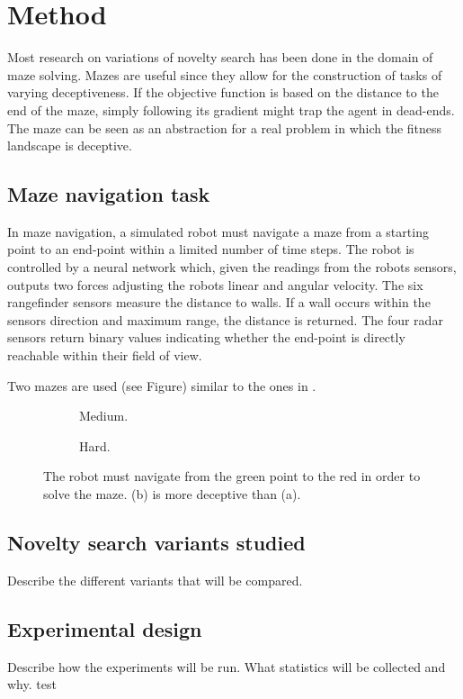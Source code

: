 \section{Method}
Most research on variations of novelty search has been done in the domain of maze solving. Mazes are useful
since they allow for the construction of tasks of varying deceptiveness. If the objective function is
based on the distance to the end of the maze, simply following its gradient might trap the agent in
dead-ends. The maze can be seen as an abstraction for a real problem in which the fitness
landscape is deceptive.

\subsection{Maze navigation task}
In maze navigation, a simulated robot must navigate a maze from a starting point to an end-point
within a limited number of time steps.
The robot is controlled by a neural network which, given the readings from the robots sensors, outputs two forces adjusting the robots linear and angular velocity. The
six rangefinder sensors measure the distance to walls. If a wall occurs within the sensors
direction and maximum range, the distance is returned. The four radar sensors return binary
values indicating whether the end-point is directly reachable within their field of view.

%

Two mazes are used (see Figure) similar to the ones in \cite{novelty_alone}.

\begin{figure}[H]
    \captionsetup[subfigure]{justification=centering}
    \centering
    \begin{mdframed}
        \begin{subfigure}[b]{0.45\textwidth}
            \centering
            \hspace*{2em}\scalebox{0.3}{}
            \caption{Medium.}
        \end{subfigure}
        \begin{subfigure}[b]{0.5\textwidth}
            \centering
            \hspace*{5em}\scalebox{0.3}{}
            \caption{Hard.}
        \end{subfigure}
    \end{mdframed}
    \caption{The robot must navigate from the green point to the red in order to solve the maze.
             (b) is more deceptive than (a).}
    \label{mazes}
\end{figure}

\subsection{Novelty search variants studied}
Describe the different variants that will be compared.

\subsection{Experimental design}
Describe how the experiments will be run. What statistics will be collected and why.
test
